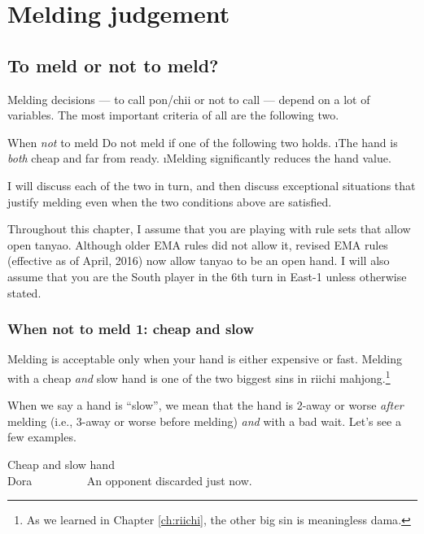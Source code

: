 
\chapter{Melding judgement} \label{ch:call}
\thispagestyle{empty}

\section{To meld or not to meld?}

Melding decisions --- to call {\jap pon}/{\jap chii} or not to call --- depend on a lot of variables. The most important criteria of all are the following two. 

\bigskip
\begin{itembox}[c]{When \emph{not} to meld}
Do not meld if one of the following two holds.
\be
\i The hand is \emph{both} cheap and far from ready.
\i Melding significantly reduces the hand value.
\ee
\end{itembox}

\bigskip
I will discuss each of the two in turn, and then discuss exceptional situations that justify melding even when the two conditions above are satisfied. 

\bigskip
Throughout this chapter, I assume that you are playing with rule sets that allow open {\jap tanyao}. Although older EMA rules did not allow it, revised EMA rules (effective as of April, 2016) now allow {\jap tanyao} to be an open hand. 
I will also assume that you are the South player in the 6th turn in East-1 unless otherwise stated. 

\newpage
\subsection{When not to meld 1: cheap and slow}
Melding is acceptable only when your hand is either expensive or fast. 
Melding with a cheap \emph{and} slow hand is one of the two biggest sins in riichi mahjong.\footnote{As we learned in Chapter \ref{ch:riichi}, the other big sin is meaningless {\jap dama}.} 

\bigskip
When we say a hand is ``slow'', we mean that the hand is 2-away or worse \emph{after} melding (i.e., 3-away or worse before melding) \emph{and} with a bad wait. Let's see a few examples. 

\bigskip
\begin{itembox}[r]{Cheap and slow hand}
\bp
{}\bai\bai~~\\
\hfill\footnotesize{{\jap Dora}~~~~~~~~~}
\ep
\vspace{-15pt}An opponent discarded {\LARGE\bai} just now.
\end{itembox}

